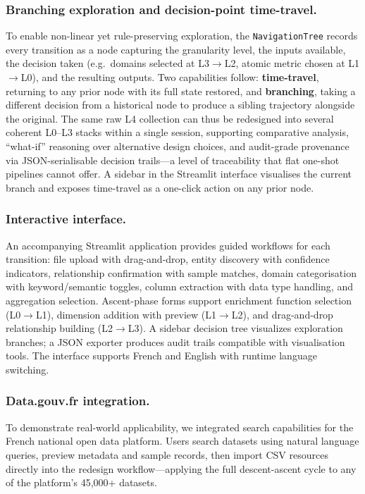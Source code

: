 \documentclass[12pt,a4paper]{article}
\begin{document}
\subsubsection{Branching exploration and decision-point time-travel.}
\noindent To enable non-linear yet rule-preserving exploration, the \texttt{NavigationTree} records every transition as a node capturing the granularity level, the inputs available, the decision taken (e.g.\ domains selected at L3$\to$L2, atomic metric chosen at L1$\to$L0), and the resulting outputs. Two capabilities follow: \textbf{time-travel}, returning to any prior node with its full state restored, and \textbf{branching}, taking a different decision from a historical node to produce a sibling trajectory alongside the original. The same raw L4 collection can thus be redesigned into several coherent L0--L3 stacks within a single session, supporting comparative analysis, ``what-if'' reasoning over alternative design choices, and audit-grade provenance via JSON-serialisable decision trails---a level of traceability that flat one-shot pipelines cannot offer. A sidebar in the Streamlit interface visualises the current branch and exposes time-travel as a one-click action on any prior node.


\subsubsection{Interactive interface.}
\noindent An accompanying Streamlit application provides guided workflows for each transition: file upload with drag-and-drop, entity discovery with confidence indicators, relationship confirmation with sample matches, domain categorisation with keyword/semantic toggles, column extraction with data type handling, and aggregation selection. Ascent-phase forms support enrichment function selection (L0$\to$L1), dimension addition with preview (L1$\to$L2), and drag-and-drop relationship building (L2$\to$L3). A sidebar decision tree visualizes exploration branches; a JSON exporter produces audit trails compatible with visualisation tools. The interface supports French and English with runtime language switching.

\subsubsection{Data.gouv.fr integration.}
To demonstrate real-world applicability, we integrated search capabilities for the French national open data platform. Users search datasets using natural language queries, preview metadata and sample records, then import CSV resources directly into the redesign workflow---applying the full descent-ascent cycle to any of the platform's 45,000+ datasets.
\end{document}
